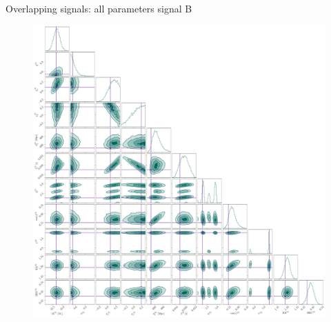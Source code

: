 \documentclass[usenames,dvipsnames,t]{beamer}
\begin{document}
\begin{frame}{Overlapping signals: all parameters signal B}
  \begin{figure}
    \centering
    \includegraphics[scale=0.1075]{Figures/OS_injection_139_v2_2_cornerplot_all.pdf}
  \end{figure}
\end{frame}



\end{document}
